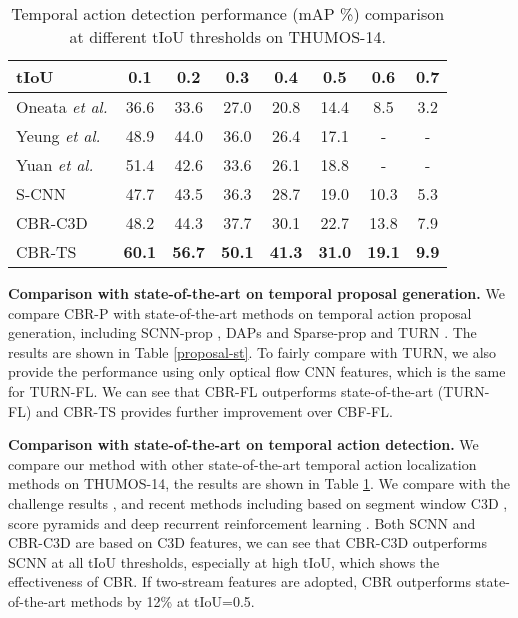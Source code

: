 \documentclass{bmvc2k}
\begin{document}
\begin{table}[]\small
\centering
\caption{Temporal action detection performance (mAP \%) comparison at different tIoU thresholds on THUMOS-14.}
\label{thumos-det}
\begin{tabular}{l|ccccccc}
\hline
tIoU     & 0.1           & 0.2           & 0.3           & 0.4           & 0.5   &0.6 &0.7        \\ \hline
Oneata \emph{et al.}\cite{oneata2014lear} & 36.6          & 33.6          & 27.0          & 20.8          & 14.4    &   8.5   & 3.2      \\ 
Yeung \emph{et al.}\cite{Yeung_2016_CVPR}  & 48.9          & 44.0          & 36.0          & 26.4          & 17.1    &-&-      \\ 
Yuan \emph{et al.} \cite{Yuan_2016_CVPR}  & 51.4          & 42.6          & 33.6          & 26.1          & 18.8 &-&-         \\ 
S-CNN \cite{Shou_2016_CVPR}         & 47.7          & 43.5          & 36.3          & 28.7          & 19.0    &10.3  & 5.3     \\ \hline
CBR-C3D          & 48.2      & 44.3          & 37.7          & 30.1          & 22.7  &13.8 &7.9\\ 


CBR-TS              & \textbf{60.1} & \textbf{56.7} & \textbf{50.1} & \textbf{41.3} & \textbf{31.0}  &\textbf{19.1}  &\textbf{9.9}\\ \hline
\end{tabular}
\end{table}

\textbf{Comparison with state-of-the-art on temporal proposal generation.}
We compare CBR-P with state-of-the-art methods on temporal action proposal generation, including SCNN-prop \cite{Shou_2016_CVPR}, DAPs\cite{escorcia2016daps} and Sparse-prop \cite{Heilbron_2016_CVPR} and TURN \cite{gao2017turn}. The results are shown in Table \ref{proposal-st}. To fairly compare with TURN, we also provide the performance using only optical flow CNN features, which is the same for TURN-FL. We can see that CBR-FL outperforms state-of-the-art (TURN-FL) and CBR-TS provides further improvement over CBF-FL.





\textbf{Comparison with state-of-the-art on temporal action detection.}
We compare our method with other state-of-the-art temporal action localization methods on THUMOS-14, the results are shown in Table \ref{thumos-det}. We compare with the challenge results \cite{oneata2014lear}, and recent methods including based on segment window C3D \cite{Shou_2016_CVPR}, score pyramids \cite{Yuan_2016_CVPR} and deep recurrent reinforcement learning \cite{Yeung_2016_CVPR}. Both SCNN and CBR-C3D are based on C3D features, we can see that CBR-C3D outperforms SCNN at all tIoU thresholds, especially at high tIoU, which shows the effectiveness of CBR. If two-stream features are adopted, CBR outperforms state-of-the-art methods by 12\% at tIoU=0.5.
\end{document}
